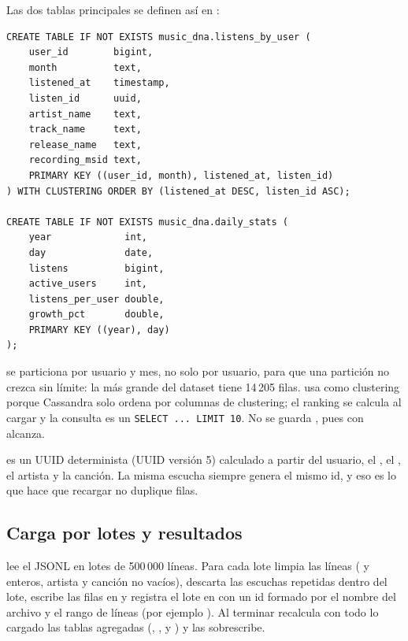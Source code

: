 Las dos tablas principales se definen así en :

\begin{lstlisting}[language=CQL]
CREATE TABLE IF NOT EXISTS music_dna.listens_by_user (
    user_id        bigint,
    month          text,
    listened_at    timestamp,
    listen_id      uuid,
    artist_name    text,
    track_name     text,
    release_name   text,
    recording_msid text,
    PRIMARY KEY ((user_id, month), listened_at, listen_id)
) WITH CLUSTERING ORDER BY (listened_at DESC, listen_id ASC);

CREATE TABLE IF NOT EXISTS music_dna.daily_stats (
    year             int,
    day              date,
    listens          bigint,
    active_users     int,
    listens_per_user double,
    growth_pct       double,
    PRIMARY KEY ((year), day)
);
\end{lstlisting}

 se particiona por usuario y mes, no solo por usuario, para que una partición no crezca sin límite: la más grande del dataset tiene 14\,205 filas.  usa  como clustering porque Cassandra solo ordena por columnas de clustering; el ranking se calcula al cargar y la consulta es un \texttt{SELECT ... LIMIT 10}. No se guarda , pues con  alcanza.

 es un UUID determinista (UUID versión 5) calculado a partir del usuario, el , el , el artista y la canción. La misma escucha siempre genera el mismo id, y eso es lo que hace que recargar no duplique filas.

\subsection{Carga por lotes y resultados}

 lee el JSONL en lotes de 500\,000 líneas. Para cada lote limpia las líneas ( y  enteros, artista y canción no vacíos), descarta las escuchas repetidas dentro del lote, escribe las filas en  y registra el lote en  con un id formado por el nombre del archivo y el rango de líneas (por ejemplo ). Al terminar recalcula con todo lo cargado las tablas agregadas (, ,  y ) y las sobrescribe.

